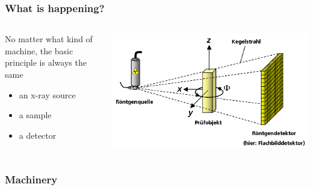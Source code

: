 \renewcommand{\imagewidth}{\linewidth}
\begin{frame}
	\frametitle{What is happening?}
	\begin{columns}%
		\begin{column}{0.49\linewidth}%
			No matter what kind of machine, the basic principle is always the same
			\begin{itemize}
				\item an x-ray source
				\item a sample
				\item a detector
			\end{itemize}
		\end{column}%
		\begin{column}{0.49\linewidth}%
			\centering%
			\includegraphics[width=\imagewidth]{./images/3D_Computed_Tomography}%
		\end{column}%
	\end{columns}%
\end{frame}

\begin{frame}
	\frametitle{Machinery}
	\begin{columns}
		\begin{column}{0.49\linewidth}
			\centering
			
		\end{column}
		\begin{column}{0.49\linewidth}
			\centering
			\only<1>{}%
			\only<2|handout:0>{}%
			\only<3|handout:0>{}%
		\end{column}
	\end{columns}
\end{frame}

